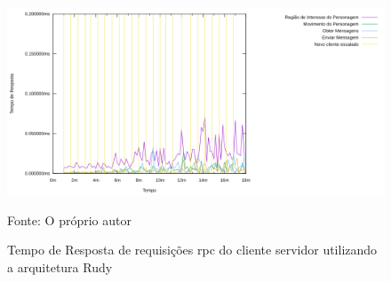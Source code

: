 \begin{figure}[htb!]
    \caption{Tempo de Resposta de requisições \ac{rpc} do cliente servidor utilizando a arquitetura Rudy}
    \label{fig:rudy_t4_reqs_rpc}
    \includegraphics[width=\textwidth]{metricas_rudy_t4/rudyc_rpc.png}
    \centering
    
    Fonte: O próprio autor
\end{figure}

